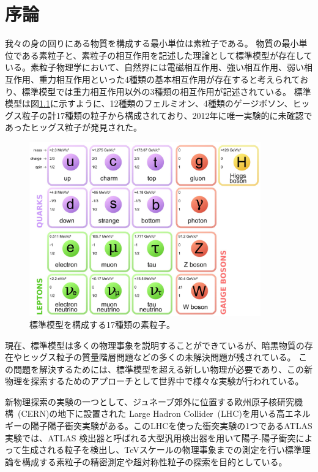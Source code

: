 \chapter{序論}
我々の身の回りにある物質を構成する最小単位は素粒子である。
物質の最小単位である素粒子と、素粒子の相互作用を記述した理論として標準模型が存在している。素粒子物理学において、自然界には電磁相互作用、強い相互作用、弱い相互作用、重力相互作用といった4種類の基本相互作用が存在すると考えられており、標準模型では重力相互作用以外の3種類の相互作用が記述されている。
標準模型は図\ref{fig:標準模型}に示すように、12種類のフェルミオン、4種類のゲージボソン、ヒッグス粒子の計17種類の粒子から構成されており、2012年に唯一実験的に未確認であったヒッグス粒子が発見された\cite{article:Higgs_boson}。
\begin{figure}[tb]
  \centering
  \includegraphics[clip, width=10cm]{fig/1/standardmodel.jpg}
  \caption{標準模型を構成する17種類の素粒子。\cite{article:elementary_particles}}
  \label{fig:標準模型}
\end{figure}

現在、標準模型は多くの物理事象を説明することができているが、暗黒物質の存在やヒッグス粒子の質量階層問題などの多くの未解決問題が残されている。
この問題を解決するためには、標準模型を超える新しい物理が必要であり、この新物理を探索するためのアプローチとして世界中で様々な実験が行われている。

新物理探索の実験の一つとして、ジュネーブ郊外に位置する欧州原子核研究機構~(CERN)\cite{article:CERN}の地下に設置された Large Hadron Collider~(LHC)\cite{article:LHC}を用いる高エネルギーの陽子陽子衝突実験がある。このLHCを使った衝突実験の1つであるATLAS実験では、ATLAS 検出器と呼ばれる大型汎用検出器を用いて陽子-陽子衝突によって生成される粒子を検出し、TeVスケールの物理事象までの測定を行い標準理論を構成する素粒子の精密測定や超対称性粒子の探索を目的としている\cite{article:ATLAS}。

